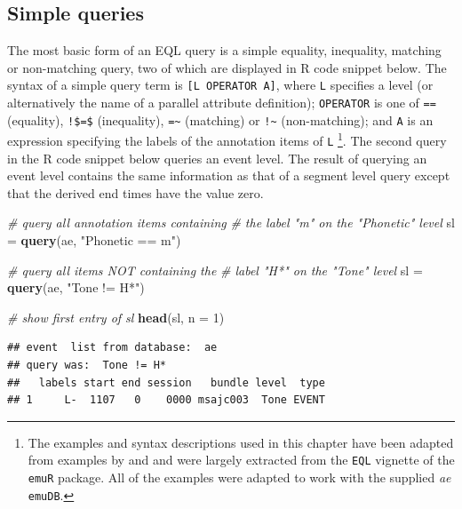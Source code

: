 \documentclass[]{book}
\newenvironment{Shaded}{\begin{snugshade}}{\end{snugshade}}
\newcommand{\CommentTok}[1]{\textcolor[rgb]{0.56,0.35,0.01}{\textit{#1}}}
\newcommand{\DataTypeTok}[1]{\textcolor[rgb]{0.13,0.29,0.53}{#1}}
\newcommand{\DecValTok}[1]{\textcolor[rgb]{0.00,0.00,0.81}{#1}}
\newcommand{\KeywordTok}[1]{\textcolor[rgb]{0.13,0.29,0.53}{\textbf{#1}}}
\newcommand{\NormalTok}[1]{#1}
\newcommand{\StringTok}[1]{\textcolor[rgb]{0.31,0.60,0.02}{#1}}
\let\rmarkdownfootnote\footnote%
\def\footnote{\protect\rmarkdownfootnote}
\theoremstyle{definition}
\theoremstyle{definition}
\theoremstyle{definition}
\theoremstyle{remark}
\begin{document}
\hypertarget{simple-queries}{%
\subsection{Simple queries}\label{simple-queries}}

The most basic form of an EQL query is a simple equality, inequality,
matching or non-matching query, two of which are displayed in R code
snippet below. The syntax of a simple query term is
\texttt{{[}L\ OPERATOR\ A{]}}, where \texttt{L} specifies a level (or
alternatively the name of a parallel attribute definition);
\texttt{OPERATOR} is one of \texttt{==} (equality), \texttt{!\$=\$}
(inequality), \texttt{=\textasciitilde{}} (matching) or
\texttt{!\textasciitilde{}} (non-matching); and \texttt{A} is an
expression specifying the labels of the annotation items of \texttt{L}
\footnote{The examples and syntax descriptions used in this chapter have
  been adapted from examples by \citet{cassidy:sc2001a} and
  \citet{harrington:2002aa} and were largely extracted from the
  \texttt{EQL} vignette of the \texttt{emuR} package. All of the
  examples were adapted to work with the supplied \emph{ae}
  \texttt{emuDB}.}. The second query in the R code snippet below queries
an event level. The result of querying an event level contains the same
information as that of a segment level query except that the derived end
times have the value zero.

\begin{Shaded}
\begin{Highlighting}[]
\CommentTok{# query all annotation items containing}
\CommentTok{# the label "m" on the "Phonetic" level}
\NormalTok{sl =}\StringTok{ }\KeywordTok{query}\NormalTok{(ae, }\StringTok{"Phonetic == m"}\NormalTok{)}

\CommentTok{# query all items NOT containing the}
\CommentTok{# label "H*" on the "Tone" level}
\NormalTok{sl =}\StringTok{ }\KeywordTok{query}\NormalTok{(ae, }\StringTok{"Tone != H*"}\NormalTok{)}

\CommentTok{# show first entry of sl}
\KeywordTok{head}\NormalTok{(sl, }\DataTypeTok{n =} \DecValTok{1}\NormalTok{)}
\end{Highlighting}
\end{Shaded}

\begin{verbatim}
## event  list from database:  ae 
## query was:  Tone != H* 
##   labels start end session   bundle level  type
## 1     L-  1107   0    0000 msajc003  Tone EVENT
\end{verbatim}
\end{document}
